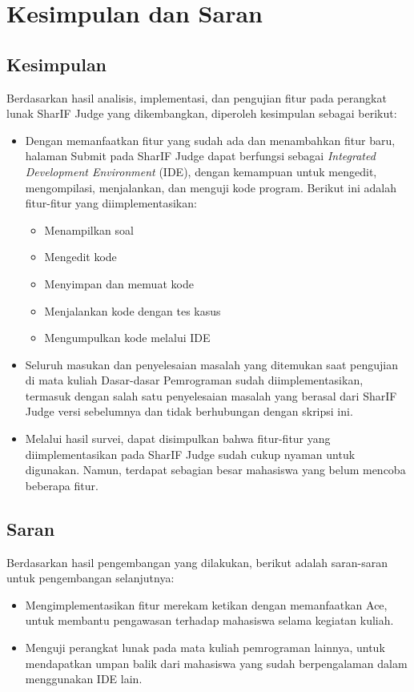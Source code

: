 \chapter{Kesimpulan dan Saran}
\label{chap:kesimpulandansaran}

\section{Kesimpulan}
\label{sec:6:kesimpulan}

Berdasarkan hasil analisis, implementasi, dan pengujian fitur pada perangkat lunak SharIF Judge yang dikembangkan, diperoleh kesimpulan sebagai berikut:

\begin{itemize}
    \item Dengan memanfaatkan fitur yang sudah ada dan menambahkan fitur baru, halaman Submit pada SharIF Judge dapat berfungsi sebagai {\it Integrated Development Environment} (IDE), dengan kemampuan untuk mengedit, mengompilasi, menjalankan, dan menguji kode program. Berikut ini adalah fitur-fitur yang diimplementasikan:
    \begin{itemize}
        \item Menampilkan soal
        \item Mengedit kode
        \item Menyimpan dan memuat kode
        \item Menjalankan kode dengan tes kasus
        \item Mengumpulkan kode melalui IDE
    \end{itemize}
    
    \item Seluruh masukan dan penyelesaian masalah yang ditemukan saat pengujian di mata kuliah Dasar-dasar Pemrograman sudah diimplementasikan, termasuk dengan salah satu penyelesaian masalah yang berasal dari SharIF Judge versi sebelumnya dan tidak berhubungan dengan skripsi ini.
    
    \item Melalui hasil survei, dapat disimpulkan bahwa fitur-fitur yang diimplementasikan pada SharIF Judge sudah cukup nyaman untuk digunakan. Namun, terdapat sebagian besar mahasiswa yang belum mencoba beberapa fitur.
\end{itemize}

\section{Saran}
\label{sec:6:saran}

Berdasarkan hasil pengembangan yang dilakukan, berikut adalah saran-saran untuk pengembangan selanjutnya:

\begin{itemize}
    \item Mengimplementasikan fitur merekam ketikan dengan memanfaatkan Ace, untuk membantu pengawasan terhadap mahasiswa selama kegiatan kuliah.
    \item Menguji perangkat lunak pada mata kuliah pemrograman lainnya, untuk mendapatkan umpan balik dari mahasiswa yang sudah berpengalaman dalam menggunakan IDE lain.
\end{itemize}